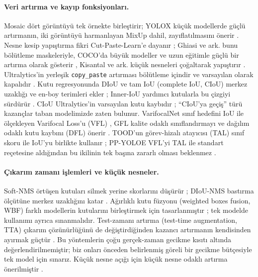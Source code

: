 \documentclass[pdflatex,iicol,sn-mathphys-num]{sn-jnl}
\begin{document}
\paragraph{Veri artırma ve kayıp fonksiyonları.}
Mosaic dört görüntüyü tek örnekte birleştirir; YOLOX küçük modellerde güçlü artırmanın, iki görüntüyü harmanlayan MixUp dahil, zayıflatılmasını önerir \cite{ge_2021_yolox}. Nesne kesip yapıştırma fikri Cut-Paste-Learn'e dayanır \cite{dwibedi_2017_cutpaste}; Ghiasi ve ark. bunu bölütleme maskeleriyle, COCO'da büyük modeller ve uzun eğitimle güçlü bir artırma olarak gösterir \cite{ghiasi_2021_copypaste}, Kisantal ve ark. küçük nesneleri çoğaltarak yapıştırır \cite{kisantal_2019_smallaug}. Ultralytics'in yerleşik \texttt{copy\_paste} artırması bölütleme içindir ve varsayılan olarak kapalıdır \cite{ultralytics_2026_v84165}. Kutu regresyonunda DIoU ve tam IoU (complete IoU, CIoU) merkez uzaklığı ve en-boy terimleri ekler \cite{zheng_2020_diou}; Inner-IoU yardımcı kutularla bu çizgiyi sürdürür \cite{zhang_2023_inneriou}. CIoU Ultralytics'in varsayılan kutu kaybıdır \cite{ultralytics_2026_v84165}; ``CIoU'ya geçiş'' türü kazançlar taban modelimizde zaten bulunur. VarifocalNet sınıf hedefini IoU ile ölçekleyen Varifocal Loss'u (VFL) \cite{zhang_2021_varifocalnet}, GFL kalite odaklı sınıflandırmayı ve dağılım odaklı kutu kaybını (DFL) önerir \cite{li_2020_gfl}. TOOD'un görev-hizalı atayıcısı (TAL) sınıf skoru ile IoU'yu birlikte kullanır \cite{feng_2021_tood}; PP-YOLOE VFL'yi TAL ile standart reçetesine aldığından bu ikilinin tek başına zararlı olması beklenmez \cite{xu_2022_ppyoloe}.

\paragraph{Çıkarım zamanı işlemleri ve küçük nesneler.}
Soft-NMS örtüşen kutuları silmek yerine skorlarını düşürür \cite{bodla_2017_softnms}; DIoU-NMS bastırma ölçütüne merkez uzaklığını katar \cite{zheng_2020_diou}. Ağırlıklı kutu füzyonu (weighted boxes fusion, WBF) farklı modellerin kutularını birleştirmek için tasarlanmıştır \cite{solovyev_2021_wbf}; tek modelde kullanımı ayrıca sınanmalıdır. Test-zamanı artırma (test-time augmentation, TTA) çıkarım çözünürlüğünü de değiştirdiğinden kazancı artırmanın kendisinden ayırmak güçtür \cite{ultralytics_2026_yolov5tta}. Bu yöntemlerin çoğu gerçek-zaman gecikme kısıtı altında değerlendirilmemiştir; biz onları önceden belirlenmiş göreli bir gecikme bütçesiyle tek model için sınarız. Küçük nesne açığı için küçük nesne odaklı artırma önerilmiştir \cite{kisantal_2019_smallaug}.
\end{document}
